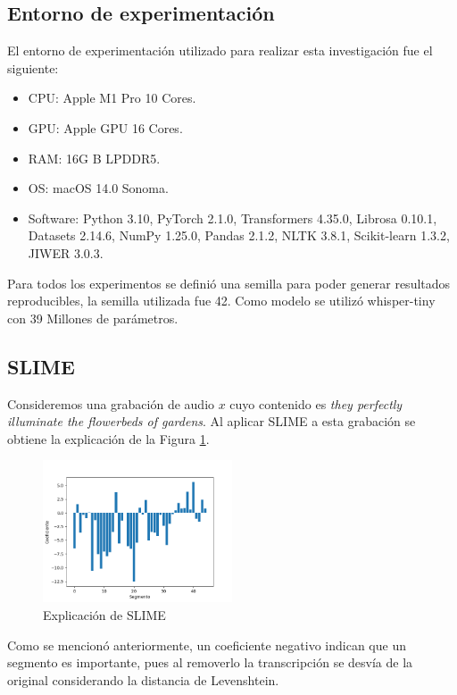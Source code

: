 \documentclass[conference]{IEEEtran}
\begin{document}
\subsection{Entorno de experimentación}
El entorno de experimentación utilizado para realizar esta investigación fue el siguiente:
\begin{itemize}
    \item CPU: Apple M1 Pro 10 Cores.
    \item GPU: Apple GPU 16 Cores.
    \item RAM: 16G B LPDDR5.
    \item OS: macOS 14.0 Sonoma.
    \item Software: Python 3.10, PyTorch 2.1.0, Transformers 4.35.0, Librosa 0.10.1, Datasets 2.14.6, NumPy 1.25.0, Pandas 2.1.2, NLTK 3.8.1, Scikit-learn 1.3.2, JIWER 3.0.3.
\end{itemize}

Para todos los experimentos se definió una semilla para poder generar resultados reproducibles, la semilla utilizada fue 42.
Como modelo se utilizó whisper-tiny con 39 Millones de parámetros.

\subsection{SLIME}

Consideremos una grabación de audio $x$ cuyo contenido es \textit{they perfectly illuminate the flowerbeds of gardens}. Al aplicar SLIME a esta grabación se obtiene la explicación de la Figura \ref{fig:slime}.

\begin{figure}[H]
\centerline{\includegraphics[width=0.5\textwidth]{./images/slime.png}}
\caption{Explicación de SLIME}
\label{fig:slime}
\end{figure}

Como se mencionó anteriormente, un coeficiente negativo indican que un segmento es importante, pues al removerlo la transcripción se desvía de la original considerando la distancia de Levenshtein.
\end{document}
